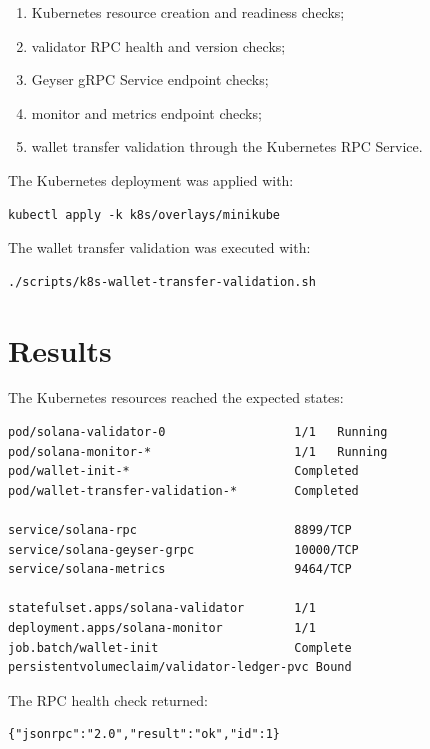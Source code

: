 \documentclass[11pt,a4paper]{article}
\begin{document}
\begin{enumerate}
  \item Kubernetes resource creation and readiness checks;
  \item validator RPC health and version checks;
  \item Geyser gRPC Service endpoint checks;
  \item monitor and metrics endpoint checks;
  \item wallet transfer validation through the Kubernetes RPC Service.
\end{enumerate}

The Kubernetes deployment was applied with:

\begin{lstlisting}[style=terminal]
kubectl apply -k k8s/overlays/minikube
\end{lstlisting}

The wallet transfer validation was executed with:

\begin{lstlisting}[style=terminal]
./scripts/k8s-wallet-transfer-validation.sh
\end{lstlisting}

\section{Results}

The Kubernetes resources reached the expected states:

\begin{lstlisting}[style=terminal]
pod/solana-validator-0                  1/1   Running
pod/solana-monitor-*                    1/1   Running
pod/wallet-init-*                       Completed
pod/wallet-transfer-validation-*        Completed

service/solana-rpc                      8899/TCP
service/solana-geyser-grpc              10000/TCP
service/solana-metrics                  9464/TCP

statefulset.apps/solana-validator       1/1
deployment.apps/solana-monitor          1/1
job.batch/wallet-init                   Complete
persistentvolumeclaim/validator-ledger-pvc Bound
\end{lstlisting}

The RPC health check returned:

\begin{lstlisting}[style=terminal]
{"jsonrpc":"2.0","result":"ok","id":1}
\end{lstlisting}
\end{document}
